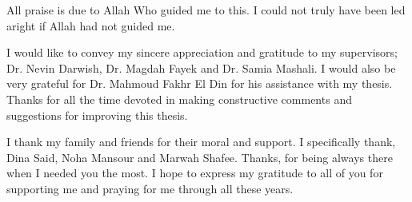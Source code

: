 \documentclass[11pt,doublespace]{SketchThesis}
\begin{document}
\begin{acknowledgments}     
All praise is due to Allah Who guided me to this. I could not truly have been led aright if Allah had not guided me.

I would like to convey my sincere appreciation and gratitude to my supervisors; Dr. Nevin Darwish, Dr. Magdah Fayek and Dr. Samia Mashali. I would also be very grateful for Dr. Mahmoud Fakhr El Din for his assistance with my thesis. Thanks for all the time devoted in making constructive comments and suggestions for improving this thesis.

 I thank my family and friends for their moral and support. I specifically thank, Dina Said, Noha Mansour and Marwah Shafee. Thanks, for being always there when I needed you the most. I hope to express my gratitude to all of you for supporting me and praying for me through all these years.
 \end{acknowledgments}                                   %

\end{document}
